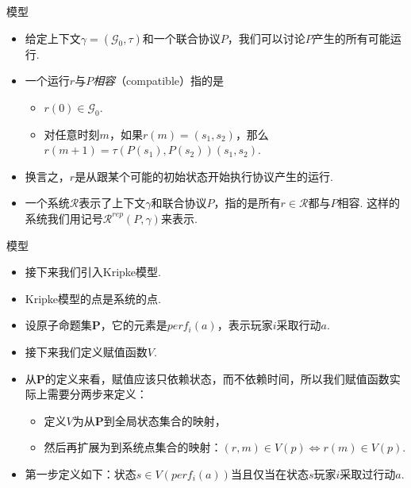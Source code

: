 \begin{frame}{模型}
\begin{itemize}
    \item 给定上下文$\gamma=(\mathcal G_0,\tau)$和一个联合协议$P$，我们可以讨论$P$产生的所有可能运行.
    \item 一个运行$r$与$P$\emph{相容}（compatible）指的是
    \begin{itemize}
        \item $r(0)\in\mathcal G_0$.
        \item 对任意时刻$m$，如果$r(m)=(s_1,s_2)$，那么$r(m+1)=\tau(P(s_1),P(s_2))(s_1,s_2)$.
    \end{itemize}
    \item 换言之，$r$是从跟某个可能的初始状态开始执行协议产生的运行.
    \item 一个系统$\mathcal R$表示了上下文$\gamma$和联合协议$P$，指的是所有$r\in\mathcal R$都与$P$相容. 这样的系统我们用记号$\mathcal R^{rep}(P,\gamma)$来表示.
\end{itemize}
\end{frame}



\begin{frame}{模型}
\begin{itemize}
    \item 接下来我们引入Kripke模型.
    \item Kripke模型的点是系统的点.
    \item 设原子命题集$\mathbf P$，它的元素是$perf_i(a)$，表示玩家$i$采取行动$a$.
    \item 接下来我们定义赋值函数$V$.
    \item 从$\mathbf P$的定义来看，赋值应该只依赖状态，而不依赖时间，所以我们赋值函数实际上需要分两步来定义：
    \begin{itemize}
        \item 定义$V$为从$\mathbf P$到全局状态集合的映射，
        \item 然后再扩展为到系统点集合的映射：$(r,m)\in V(p)\iff r(m)\in V(p)$.
    \end{itemize}
    \item 第一步定义如下：状态$s\in V(perf_i(a))$当且仅当在状态$s$玩家$i$采取过行动$a$.
\end{itemize}
\end{frame}

